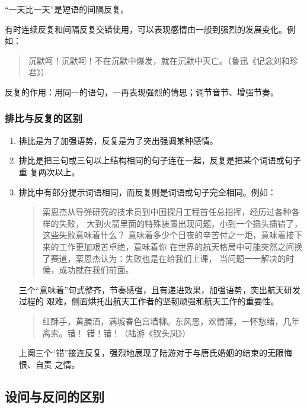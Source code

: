 \documentclass[final,oneside]{ctexbook}
\newenvironment{equotation}{\begin{quotation}\kaishu}{\end{quotation}}
\begin{document}
“一天比一天”是短语的间隔反复。

有时连续反复和间隔反复交错使用，可以表现感情由一般到强烈的发展变化。例如：

\begin{equotation}
  沉默呵！沉默呵！不在沉默中爆发，就在沉默中灭亡。（鲁迅《记念刘和珍君》）
\end{equotation}

反复的作用：用同一的语句，一再表现强烈的情思；调节音节、增强节奏。

\subsubsection{排比与反复的区别}

\begin{enumerate}
  \item 排比是为了加强语势，反复是为了突出强调某种感情。

  \item 排比是把三句或三句以上结构相同的句子连在一起，反复是把某个词语或句子重
    复两次以上。

  \item 排比中有部分提示词语相同，而反复则是词语或句子完全相同。例如：

    \begin{equotation}
      栾恩杰从导弹研究的技术员到中国探月工程首任总指挥，经历过各种各样的失败，
      大到火箭里面的特殊装置出现问题，小到一个插头插错了，这些失败意味着什么？
      意味着多少个日夜的辛苦付之一炬，意味着接下来的工作更加艰苦卓绝，意味着你
      在世界的航天格局中可能突然之间换了赛道，栾恩杰认为：失败也是在给我们上课，
      当问题一一解决的时候，成功就在我们前面。
    \end{equotation}
    三个“意味着”句式整齐，节奏感强，且有递进效果，加强语势，突出航天研发过程的
    艰难，侧面烘托出航天工作者的坚韧顽强和航天工作的重要性。

    \begin{equotation}
      红酥手，黄縢酒，满城春色宫墙柳。东风恶，欢情薄，一怀愁绪，几年离索。错！
      错！错！（陆游《钗头凤》）
    \end{equotation}
    上阕三个“错”接连反复，强烈地展现了陆游对于与唐氏婚姻的结束的无限悔恨、自责
    之情。

\end{enumerate}

\subsection{设问与反问的区别}
\end{document}
